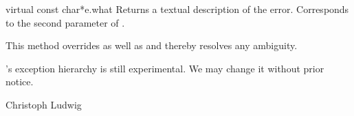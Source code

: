 \begin{cfcode}{virtual const char*}{e.what}{}
  Returns a textual description of the error. Corresponds to the second
  parameter of .

  This method overrides  as well as
   and thereby resolves any ambiguity.
\end{cfcode}



\SEEALSO
{}



\WARNINGS

\LiDIA's exception hierarchy is still experimental. We may change it without
prior notice.


\AUTHOR

Christoph Ludwig



